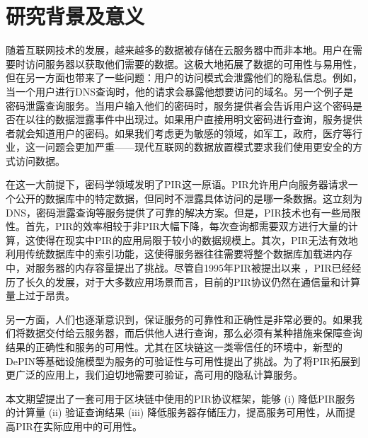 \section{研究背景及意义}


随着互联网技术的发展，越来越多的数据被存储在云服务器中而非本地。用户在需要时访问服务器以获取他们需要的数据。这极大地拓展了数据的可用性与易用性，但在另一方面也带来了一些问题：用户的访问模式会泄露他们的隐私信息。例如，当一个用户进行DNS查询时，他的请求会暴露他想要访问的域名。另一个例子是密码泄露查询服务。当用户输入他们的密码时，服务提供者会告诉用户这个密码是否在以往的数据泄露事件中出现过。如果用户直接用明文密码进行查询，服务提供者就会知道用户的密码。如果我们考虑更为敏感的领域，如军工，政府，医疗等行业，这一问题会更加严重——现代互联网的数据放置模式要求我们使用更安全的方式访问数据。

在这一大前提下，密码学领域发明了PIR这一原语。PIR允许用户向服务器请求一个公开的数据库中的特定数据，但同时不泄露具体访问的是哪一条数据。这立刻为DNS，密码泄露查询等服务提供了可靠的解决方案。但是，PIR技术也有一些局限性。首先，PIR的效率相较于非PIR大幅下降，每次查询都需要双方进行大量的计算，这使得在现实中PIR的应用局限于较小的数据规模上。其次，PIR无法有效地利用传统数据库中的索引功能，这使得服务器往往需要将整个数据库加载进内存中，对服务器的内存容量提出了挑战。尽管自1995年PIR被提出以来 \cite{FOCS:CGKS95}，PIR已经经历了长久的发展，对于大多数应用场景而言，目前的PIR协议仍然在通信量和计算量上过于昂贵。

另一方面，人们也逐渐意识到，保证服务的可靠性和正确性是非常必要的。如果我们将数据交付给云服务器，而后供他人进行查询，那么必须有某种措施来保障查询结果的正确性和服务的可用性。尤其在区块链这一类零信任的环境中，新型的DePIN等基础设施模型为服务的可验证性与可用性提出了挑战。为了将PIR拓展到更广泛的应用上，我们迫切地需要可验证，高可用的隐私计算服务。

本文期望提出了一套可用于区块链中使用的PIR协议框架，能够 (i) 降低PIR服务的计算量 (ii) 验证查询结果 (iii) 降低服务器存储压力，提高服务可用性，从而提高PIR在实际应用中的可用性。